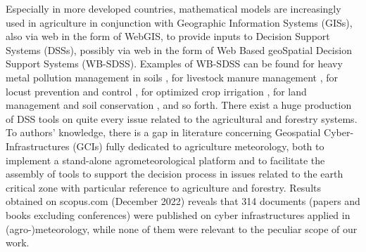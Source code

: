 \documentclass[authoryear,preprint,review,12pt]{elsarticle}
\newcommand{\note}[1]{\emph{\textcolor{red}{#1}}}
\begin{document}
Especially in more developed countries, mathematical models are increasingly used in agriculture in conjunction with Geographic Information Systems (GISs), also via web in the form of WebGIS, to provide inputs to Decision Support Systems (DSSs), possibly via web in the form of Web Based geoSpatial Decision Support Systems (WB-SDSS).
Examples of WB-SDSS can be found 
for heavy metal pollution management in soils \citep{Wang:wbsdss:2005}, 
for livestock manure management \citep{Acutis:wbsdss:2014}, 
for locust prevention and control \citep{Yao:wbsdss:2017}, 
for optimized crop irrigation \citep{Giusti:wbsdss:2015}, 
for land management and soil conservation \citep{Terribile:soilconsweb:2015}, 
and so forth.
There exist a huge production of DSS tools on quite every issue related to the agricultural and forestry systems.
To authors' knowledge, there is a gap in literature concerning Geospatial Cyber-Infrastructures (GCIs) fully dedicated to agriculture meteorology, both to implement a stand-alone agrometeorological platform and to facilitate the assembly of tools to support the decision process in issues related to the earth critical zone with particular reference to agriculture and forestry. 
Results obtained on scopus.com (December 2022) reveals that 314 documents (papers and books excluding conferences) were published on cyber infrastructures applied in (agro-)meteorology, while none of them were relevant to the peculiar scope of our work.
\end{document}
